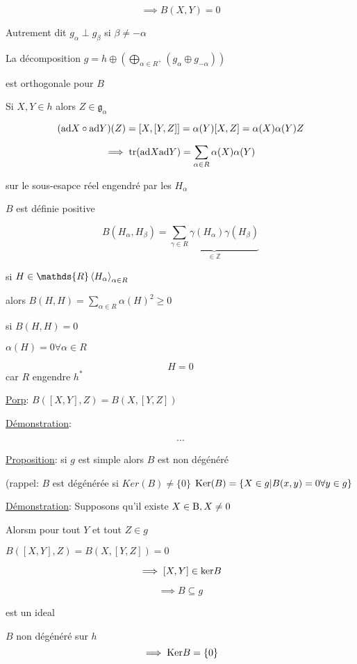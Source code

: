 \[ \implies B(X,Y) =0 \]

Autrement dit \(g_{\alpha} \perp g_{\beta} \) si \(\beta \neq - \alpha\)

La décomposition \(g = h \oplus \left( \bigoplus_{\alpha\in{}R^{+}} \left( g_{\alpha} \oplus g_{-\alpha}   \right)  \right) \)

est orthogonale pour \(B\)

Si \(X,Y \in h\) alors \(Z \in \mathfrak{g}_\alpha \)


\[ ({\rm{}ad} X \circ {\rm{}ad}Y)(Z) = [X, [ Y, Z]] = \alpha(Y) [X, Z] = \alpha (X) \alpha(Y) Z\]


\[ \implies \tr( {\rm{}ad} X {\rm{}ad}Y ) = \sum_{\alpha\in R} \alpha(X) \alpha (Y)  \]

sur le sous-esapce réel engendré par les \(H_\alpha\)

\(B\) est définie positive 

\[ B(H_{\alpha}, H_{\beta} ) = \underbrace{\sum_{\gamma\in R} \gamma(H_{\alpha}) \gamma ( H_{\beta} )}_{\in \mathds{Z}}     \]


si \(H \in \mathds{R} \expval{H_{\alpha}}_{\alpha\in R} \)

alors \(B(H, H) = \sum_{\alpha\in R} \alpha (H)^{2} \geq 0  \)


si \(B(H,H) = 0\)

\(\alpha(H) = 0 \forall \alpha \in R\)

\[ H = 0 \] car \( R\) engendre \(h^{*}\)


\underline{Porp}: \(B( [X, Y], Z) = B( X, [Y, Z] )\) 

\underline{Démonstration}:

\[ \dotsb \]

\underline{Proposition}: si \(g\) est simple alors \(B\) est non dégénéré  

(rappel: \(B\) est dégénérée si \(Ker (B) \neq \{ 0 \}  \)  \({\rm{}Ker} (B) = \{ X \in g | B(x,y) = 0 \forall y \in g \} \)

\underline{Démonstration}: Supposons qu'il existe \(X \in {\rm{}B}, X \neq 0\)  

Alorsm pour tout \(Y\) et tout \(Z\in g\)

\(B( [X, Y] , Z )  =  B(X, [Y, Z] ) = 0\)

\[ \implies [X, Y] \in {\rm{}ker} B  \]

\[ \implies B \subseteq g \]

est un ideal


\(B\) non dégénéré sur \(h\) \[  \implies {\rm{}Ker} B = \{ 0 \}  \]






